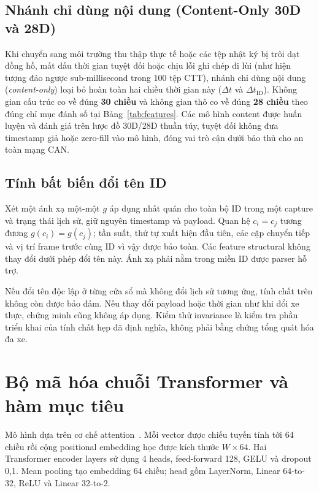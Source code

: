 \documentclass[12pt, a4paper, reqno, oneside]{book}
\begin{document}
\subsection{Nhánh chỉ dùng nội dung (Content-Only 30D và 28D)}\label{subsec:content-features-def}
Khi chuyển sang môi trường thu thập thực tế hoặc các tệp nhật ký bị trôi dạt đồng hồ, mất dấu thời gian tuyệt đối hoặc chịu lỗi ghi chép đi lùi (như hiện tượng đảo ngược sub-millisecond trong 100 tệp CTT), nhánh chỉ dùng nội dung (\textit{content-only}) loại bỏ hoàn toàn hai chiều thời gian này ($\Delta t$ và $\Delta t_{\text{ID}}$). Không gian cấu trúc co về đúng \textbf{30 chiều} và không gian thô co về đúng \textbf{28 chiều} theo đúng chỉ mục đánh số tại Bảng~\ref{tab:features}. Các mô hình content được huấn luyện và đánh giá trên lược đồ 30D/28D thuần túy, tuyệt đối không đưa timestamp giả hoặc zero-fill vào mô hình, đóng vai trò cận dưới bảo thủ cho an toàn mạng CAN.

\subsection{Tính bất biến đổi tên ID}
Xét một ánh xạ một-một $g$ áp dụng nhất quán cho toàn bộ ID trong một capture và trạng thái lịch sử, giữ nguyên timestamp và payload. Quan hệ $c_i=c_j$ tương đương $g(c_i)=g(c_j)$; tần suất, thứ tự xuất hiện đầu tiên, các cặp chuyển tiếp và vị trí frame trước cùng ID vì vậy được bảo toàn. Các feature structural không thay đổi dưới phép đổi tên này. Ánh xạ phải nằm trong miền ID được parser hỗ trợ.

Nếu đổi tên độc lập ở từng cửa sổ mà không đổi lịch sử tương ứng, tính chất trên không còn được bảo đảm. Nếu thay đổi payload hoặc thời gian như khi đổi xe thực, chứng minh cũng không áp dụng. Kiểm thử invariance là kiểm tra phần triển khai của tính chất hẹp đã định nghĩa, không phải bằng chứng tổng quát hóa đa xe.

\section{Bộ mã hóa chuỗi Transformer và hàm mục tiêu}\label{sec:transformer-encoder}
Mô hình dựa trên cơ chế attention~\cite{vaswani2017attention}. Mỗi vector được chiếu tuyến tính tới 64 chiều rồi cộng positional embedding học được kích thước $W\times64$. Hai Transformer encoder layers sử dụng 4 heads, feed-forward 128, GELU và dropout 0,1. Mean pooling tạo embedding 64 chiều; head gồm LayerNorm, Linear 64-to-32, ReLU và Linear 32-to-2.
\end{document}
